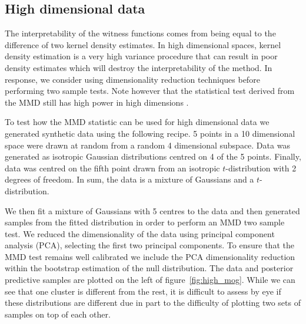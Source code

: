 \documentclass{article} %
\begin{document}
\subsection{High dimensional data}

\label{sec:high_dim}

The interpretability of the witness functions comes from being equal to the difference of two kernel density estimates.
In high dimensional spaces, kernel density estimation is a very high variance procedure that can result in poor density estimates which will destroy the interpretability of the method.
In response, we consider using dimensionality reduction techniques before performing two sample tests.
Note however that the statistical test derived from the MMD still has high power in high dimensions \citep{Gretton2008-ik}.

To test how the MMD statistic can be used for high dimensional data we generated synthetic data using the following recipe.
5 points in a 10 dimensional space were drawn at random from a random 4 dimensional subspace\footnotemark.
Data was generated as isotropic Gaussian distributions centred on 4 of the 5 points.
Finally, data was centred on the fifth point drawn from an isotropic $t$-distribution with 2 degrees of freedom.
In sum, the data is a mixture of Gaussians and a $t$-distribution.

We then fit a mixture of Gaussians with 5 centres to the data and then generated samples from the fitted distribution in order to perform an MMD two sample test.
We reduced the dimensionality of the data using principal component analysis (PCA), selecting the first two principal components.
To ensure that the MMD test remains well calibrated we include the PCA dimensionality reduction within the bootstrap estimation of the null distribution.
The data and posterior predictive samples are plotted on the left of figure~\ref{fig:high_mog}.
While we can see that one cluster is different from the rest, it is difficult to assess by eye if these distributions are different due in part to the difficulty of plotting two sets of samples on top of each other.
\end{document}
